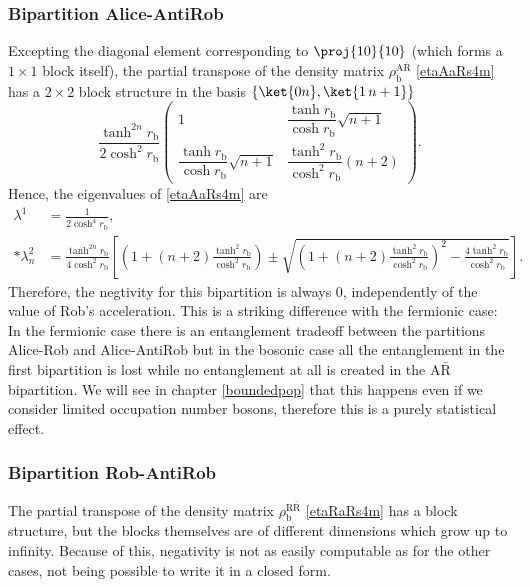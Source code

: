 \subsubsection{Bipartition Alice-AntiRob}

Excepting the diagonal element corresponding to $\proj{10}{10}$ (which forms a $1\times1$ block itself), the partial transpose of the density matrix $\rho_\text{b}^{\text{A}{\bar{\text{R}}}}$ \eqref{etaAaRs4m} has a $2\times2$ block structure in the basis $\{ \ket{0 n},\ket{1\, n+1}\}$ 
\begin{equation}\label{blocksbosAaR}
\frac{\tanh^{2n}r_\text{b}}{2\cosh^2 r_\text{b}}
\left(\!\begin{array}{cc}
1 & \dfrac{\tanh r_\text{b}}{\cosh r_\text{b}}\sqrt{n+1}\\
\dfrac{\tanh r_\text{b}}{\cosh r_\text{b}}\sqrt{n+1} & \dfrac{\tanh^2 r_\text{b}}{\cosh^2r_\text{b}}(n+2)
\end{array}\!\right).
\end{equation}
Hence, the eigenvalues of \eqref{etaAaRs4m} are
\begin{align}
\nonumber\lambda^1&=\frac{1}{2\cosh^4 r_\text{b}},\\*
\lambda^2_n&=\frac{\tanh^{2n}r_\text{b}}{4\cosh^2 r_\text{b}}\left[\left(1+(n+2)\frac{\tanh^2 r_\text{b}}{\cosh^2 r_\text{b}}\right)\pm\sqrt{\left(1+(n+2)\frac{\tanh^2 r_\text{b}}{\cosh^2 r_\text{b}}\right)^2-\frac{4\tanh^2 r_\text{b}}{\cosh^2 r_\text{b}}}\right].
\end{align}
Therefore, the negtivity for this bipartition is always $0$, independently of the value of Rob's acceleration. This is a striking difference with the fermionic case: In the fermionic case there is an entanglement tradeoff between the partitions Alice-Rob and Alice-AntiRob but in the bosonic case all the entanglement in the first bipartition is lost while no entanglement at all is created in the A${\bar{\text{R}}}$ bipartition. We will see in chapter \ref{boundedpop} that this happens even if we consider limited occupation number bosons, therefore this is a purely statistical effect.

\subsubsection{Bipartition Rob-AntiRob}

The partial transpose of the density matrix $\rho^{\text{R}{\bar{\text{R}}}}_\text{b}$  \eqref{etaRaRs4m} has a block structure, but the blocks themselves are of different dimensions  which grow up to infinity. Because of this, negativity is not as easily computable as for the other cases, not being possible to write it in a closed form.

